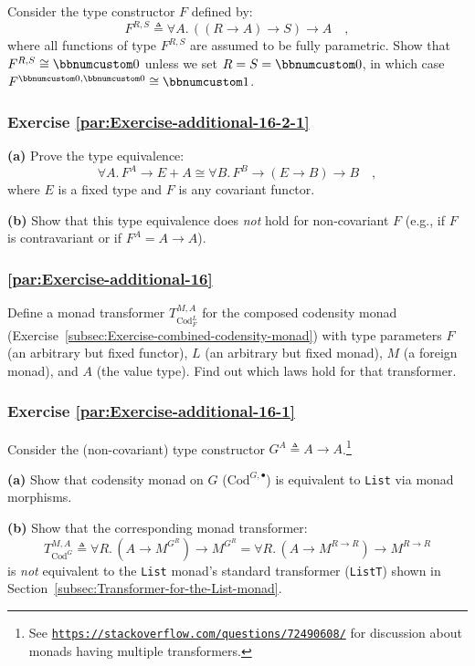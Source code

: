 Consider the type constructor $F$ defined by:
\[
F^{R,S}\triangleq\forall A.\,((R\rightarrow A)\rightarrow S)\rightarrow A\quad,
\]
where all functions of type $F^{R,S}$ are assumed to be fully parametric.
Show that $F^{R,S}\cong\bbnum 0$ unless we set $R=S=\bbnum 0$, in
which case $F^{\bbnum 0,\bbnum 0}\cong\bbnum 1$. 

\subsubsection{Exercise \label{par:Exercise-additional-16-2-1}\ref{par:Exercise-additional-16-2-1}}

\textbf{(a)} Prove the type equivalence:
\[
\forall A.\,F^{A}\rightarrow E+A\cong\forall B.\,F^{B}\rightarrow(E\rightarrow B)\rightarrow B\quad,
\]
where $E$ is a fixed type and $F$ is any covariant functor.

\textbf{(b)} Show that this type equivalence does \emph{not} hold
for non-covariant $F$ (e.g., if $F$ is contravariant or if $F^{A}=A\rightarrow A$).

\subsubsection{\label{par:Exercise-additional-16}\ref{par:Exercise-additional-16}}

Define a monad transformer $T_{\text{Cod}_{F}^{L}}^{M,A}$ for the
composed codensity monad (Exercise~\ref{subsec:Exercise-combined-codensity-monad})
with type parameters $F$ (an arbitrary but fixed functor), $L$ (an
arbitrary but fixed monad), $M$ (a foreign monad), and $A$ (the
value type). Find out which laws hold for that transformer.

\subsubsection{Exercise \label{par:Exercise-additional-16-1}\ref{par:Exercise-additional-16-1}}

Consider the (non-covariant) type constructor $G^{A}\triangleq A\rightarrow A$.\footnote{See \texttt{\href{https://stackoverflow.com/questions/72490608/}{https://stackoverflow.com/questions/72490608/}}
for discussion about monads having multiple transformers.}

\textbf{(a)} Show that codensity monad on $G$ ($\text{Cod}^{G,\bullet}$)
is equivalent to \lstinline!List! via monad morphisms.

\textbf{(b)} Show that the corresponding monad transformer: 
\[
T_{\text{Cod}^{G}}^{M,A}\triangleq\forall R.\,(A\rightarrow M^{G^{R}})\rightarrow M^{G^{R}}=\forall R.\,(A\rightarrow M^{R\rightarrow R})\rightarrow M^{R\rightarrow R}
\]
is \emph{not} equivalent to the \lstinline!List! monad\textsf{'}s standard
transformer (\lstinline!ListT!) shown in Section~\ref{subsec:Transformer-for-the-List-monad}.

